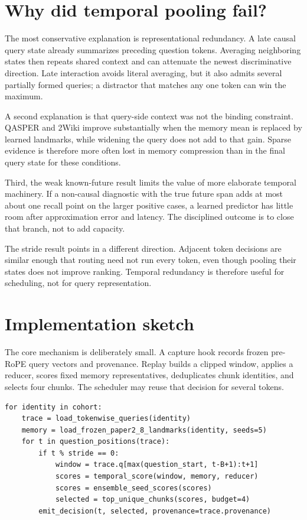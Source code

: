 \documentclass[11pt]{article}
\begin{document}
\section{Why did temporal pooling fail?}
The most conservative explanation is representational redundancy. A late causal query state already summarizes preceding question tokens. Averaging neighboring states then repeats shared context and can attenuate the newest discriminative direction. Late interaction avoids literal averaging, but it also admits several partially formed queries; a distractor that matches any one token can win the maximum.

A second explanation is that query-side context was not the binding constraint. QASPER and 2Wiki improve substantially when the memory mean is replaced by learned landmarks, while widening the query does not add to that gain. Sparse evidence is therefore more often lost in memory compression than in the final query state for these conditions.

Third, the weak known-future result limits the value of more elaborate temporal machinery. If a non-causal diagnostic with the true future span adds at most about one recall point on the larger positive cases, a learned predictor has little room after approximation error and latency. The disciplined outcome is to close that branch, not to add capacity.

The stride result points in a different direction. Adjacent token decisions are similar enough that routing need not run every token, even though pooling their states does not improve ranking. Temporal redundancy is therefore useful for scheduling, not for query representation.

\section{Implementation sketch}
The core mechanism is deliberately small. A capture hook records frozen pre-RoPE query vectors and provenance. Replay builds a clipped window, applies a reducer, scores fixed memory representatives, deduplicates chunk identities, and selects four chunks. The scheduler may reuse that decision for several tokens.

\begin{verbatim}
for identity in cohort:
    trace = load_tokenwise_queries(identity)
    memory = load_frozen_paper2_8_landmarks(identity, seeds=5)
    for t in question_positions(trace):
        if t % stride == 0:
            window = trace.q[max(question_start, t-B+1):t+1]
            scores = temporal_score(window, memory, reducer)
            scores = ensemble_seed_scores(scores)
            selected = top_unique_chunks(scores, budget=4)
        emit_decision(t, selected, provenance=trace.provenance)
\end{verbatim}
\end{document}
